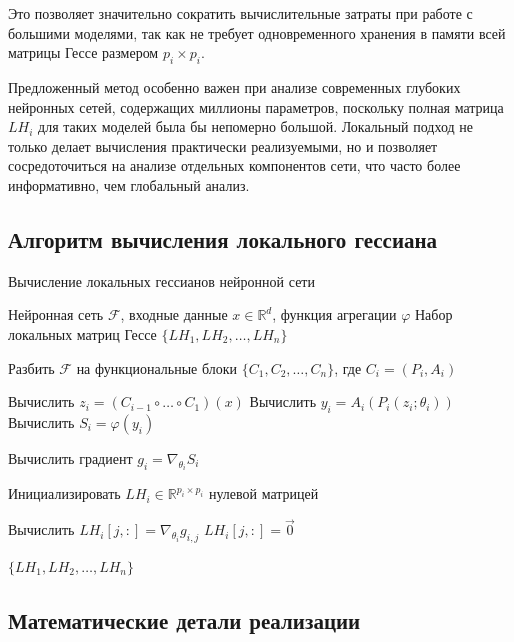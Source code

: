 \documentclass[a4paper,12pt]{article}
\begin{document}
Это позволяет значительно сократить вычислительные затраты при работе с большими моделями, так как не требует
одновременного хранения в памяти всей матрицы Гессе размером $p_i \times p_i$.

Предложенный метод особенно важен при анализе современных глубоких нейронных сетей, содержащих миллионы
параметров, поскольку полная матрица $LH_i$ для таких моделей была бы непомерно большой.
Локальный подход не
только делает вычисления практически реализуемыми, но и позволяет сосредоточиться на анализе отдельных
компонентов сети, что часто более информативно, чем глобальный анализ.

\subsection{Алгоритм вычисления локального гессиана}

\begin{algorithm}
  \caption{Вычисление локальных гессианов нейронной сети}
  \begin{algorithmic}[1]
    \Require Нейронная сеть $\mathcal{F}$, входные данные $x \in \mathbb{R}^d$, функция агрегации $\varphi$
    \Ensure Набор локальных матриц Гессе $\{LH_1, LH_2, \ldots, LH_n\}$

    \State Разбить $\mathcal{F}$ на функциональные блоки $\{C_1, C_2, \ldots, C_n\}$, где $C_i = (P_i, A_i)$

    \State Вычислить $z_i = (C_{i-1} \circ \ldots \circ C_1)(x)$ 
    \State Вычислить $y_i = A_i(P_i(z_i; \theta_i))$ 
    \State Вычислить $S_i = \varphi(y_i)$ 

    \State Вычислить градиент $g_i = \nabla_{\theta_i} S_i$

    \State Инициализировать $LH_i \in \mathbb{R}^{p_i \times p_i}$ нулевой матрицей

    \State Вычислить $LH_i[j,:] = \nabla_{\theta_i} g_{i,j}$
    \Else
    \State $LH_i[j,:] = \vec{0}$
    \EndIf
    \EndFor
    \EndFor

    \State \Return $\{LH_1, LH_2, \ldots, LH_n\}$
  \end{algorithmic}
\end{algorithm}

\subsection{Математические детали реализации}
\end{document}
